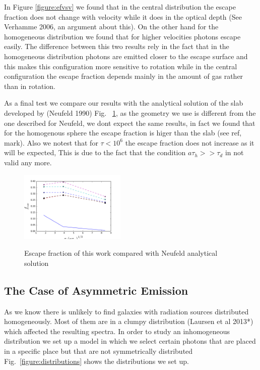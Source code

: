 \documentclass[usenatbib]{mn2e}
\begin{document}
In Figure \ref{figure:efvsv} we found that in the central distribution
the escape fraction does not change with velocity while it does in the
optical depth (See Verhamme 2006, an argument about this). On the other
hand for the homogeneous distribution we
found that for higher velocities photons escape easily. The difference
between this two results rely in the fact that in the homogeneous
distribution photons are emitted closer to the escape surface and this
makes this configuration more sensitive to rotation while in the
central configuration the escape fraction depends mainly in the amount
of gas rather than in rotation. 

As a final test we compare our results with the analytical solution of 
the slab developed by (Neufeld 1990) Fig. ~\ref{figure:efvsNeufeld}, as 
the geometry we use is different from the one described for Neufeld, we 
dont expect the same results, in fact we found that for the homogenous 
sphere the escape fraction is higer than the slab (see ref, mark). Also 
we notest that for $\tau<10^{6}$ the escape fraction does not increase 
as it will be expected, This is due to the fact that the condition 
$a\tau_{h}>>\tau_{d}$ in not valid any more.


\begin{figure}
  \includegraphics[width=0.45\textwidth]{Neufeld.png}
 \label{figure:efvsNeufeld}\caption{Escape fraction of this work
   compared with Neufeld analytical solution}  
\end{figure}

\subsection{The Case of Asymmetric Emission}

As we know there is unlikely to find galaxies with radiation sources 
distributed homogeneously. Most of them are in a clumpy distribution 
(Laursen et al 2013*) which affected the resulting spectra. In order 
to study an inhomogeneous distribution we set up a model in which we 
select certain photons that are placed in a specific place but that 
are not symmetrically distributed Fig.~\ref{figure:distributions} shows
the distributions we set up. 
\end{document}
